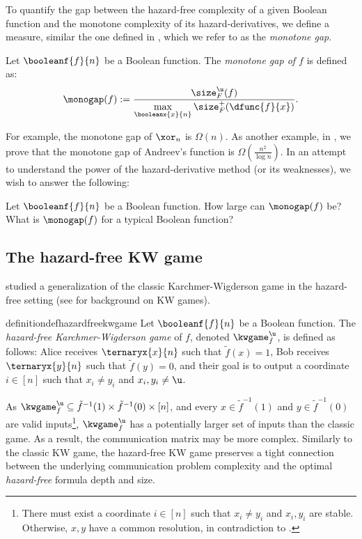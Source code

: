 \documentclass[acmsmall, nonacm, authorversion]{acmart}
\begin{document}
To quantify the gap between the hazard-free complexity of a given Boolean function and the monotone complexity of its hazard-derivatives, we define a measure, similar the one defined in \cite[Section $7$]{Juk21}, which we refer to as the \emph{monotone gap}.

\begin{definition}\label{def:the-monotone-gap}
Let $\booleanf{f}{n}$ be a Boolean function. The \emph{monotone gap of $f$} is defined as:
\[
\monogap(f):=\frac{ \size_F^\u(f)}{\max\limits_{\booleanx{x}{n}} \size_F^+(\dfunc{f}{x})}.
\]
\end{definition}

For example, the monotone gap of $\xor_n$ is $\Omega(n)$. As another example, in , we prove that the monotone gap of Andreev's function \cite{And87} is $\Omega\left(\frac{n^2}{\log n}\right)$. In an attempt to understand the power of the hazard-derivative method (or its weaknesses), we wish to answer the following:
\begin{question}\label{que:monotone-gap}
Let $\booleanf{f}{n}$ be a Boolean function. How large can $\monogap(f)$ be? What is $\monogap(f)$ for a typical Boolean function?
\end{question}

\subsection{The hazard-free KW game} 
\cite{IK23} studied a generalization of the classic Karchmer-Wigderson game \cite{KW90} in the hazard-free setting (see  for background on KW games). 

\begin{restatable}{definition}{defhazardfreekwgame}\label{def:hazard-free-kw-game}
Let $\booleanf{f}{n}$ be a Boolean function. The \emph{hazard-free Karchmer-Wigderson game} of $f$, denoted $\kwgame_{f}^{\u}$, is defined as follows: Alice receives $\ternaryx{x}{n}$ such that $\tilde{f}(x)=1$, Bob receives $\ternaryx{y}{n}$ such that $\tilde{f}(y)=0$, and their goal is to output a coordinate $i\in[n]$ such that $x_{i} \neq y_{i}$ and $x_{i},y_{i} \neq \u$.
\end{restatable}

As $\kwgame^{\u}_f\subseteq \tilde{f}^{-1}(1) \times \tilde{f}^{-1}(0) \times [n]$, and every $x\in \tilde{f}^{-1}(1)$ and $y\in \tilde{f}^{-1}(0)$ are valid inputs\footnote{There must exist a coordinate $i\in[n]$ such that $x_i\neq y_i$ and $x_i,y_i$ are stable. Otherwise, $x,y$ have a common resolution, in contradiction to .}, $\kwgame^{\u}_f$ has a potentially larger set of inputs than the classic game. As a result, the communication matrix may be more complex. Similarly to the classic KW game, the hazard-free KW game preserves a tight connection between the underlying communication problem complexity and the optimal \emph{hazard-free} formula depth and size. 
\end{document}

